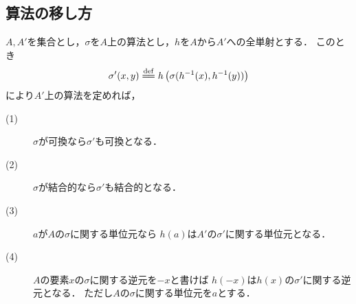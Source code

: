 \subsection{算法の移し方}
	$A,A'$を集合とし，$\sigma$を$A$上の算法とし，$h$を$A$から$A'$への全単射とする．
	このとき
	\begin{align}
		\sigma'(x,y) \defeq h\left(\sigma(h^{-1}(x),h^{-1}(y))\right)
	\end{align}
	により$A'$上の算法を定めれば，
	\begin{description}
		\item[(1)] $\sigma$が可換なら$\sigma'$も可換となる．
		\item[(2)] $\sigma$が結合的なら$\sigma'$も結合的となる．
		\item[(3)] $a$が$A$の$\sigma$に関する単位元なら
			$h(a)$は$A'$の$\sigma'$に関する単位元となる．
		\item[(4)] $A$の要素$x$の$\sigma$に関する逆元を$-x$と書けば
			$h(-x)$は$h(x)$の$\sigma'$に関する逆元となる．
			ただし$A$の$\sigma$に関する単位元を$a$とする．
	\end{description}
	
